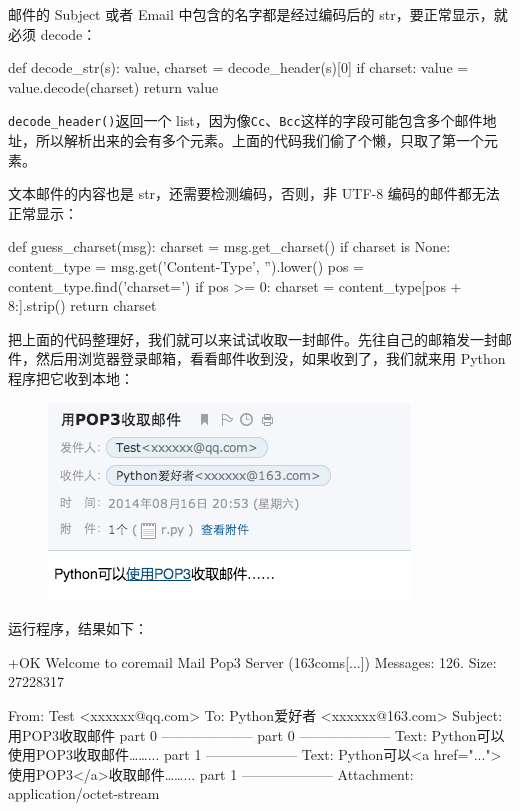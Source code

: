 邮件的 Subject 或者 Email 中包含的名字都是经过编码后的
str，要正常显示，就必须 decode：

\begin{pythoncode}
def decode_str(s):
    value, charset = decode_header(s)[0]
    if charset:
        value = value.decode(charset)
    return value
\end{pythoncode}

\texttt{decode\_header()}返回一个
list，因为像\texttt{Cc}、\texttt{Bcc}这样的字段可能包含多个邮件地址，所以解析出来的会有多个元素。上面的代码我们偷了个懒，只取了第一个元素。

文本邮件的内容也是 str，还需要检测编码，否则，非 UTF-8
编码的邮件都无法正常显示：

\begin{pythoncode}
def guess_charset(msg):
    charset = msg.get_charset()
    if charset is None:
        content_type = msg.get('Content-Type', '').lower()
        pos = content_type.find('charset=')
        if pos >= 0:
            charset = content_type[pos + 8:].strip()
    return charset
\end{pythoncode}

把上面的代码整理好，我们就可以来试试收取一封邮件。先往自己的邮箱发一封邮件，然后用浏览器登录邮箱，看看邮件收到没，如果收到了，我们就来用
Python 程序把它收到本地：

 
 \begin{figure}[htp]
	\centering
	\includegraphics[width=0.6\linewidth]{fig/967965753208928.png}
\end{figure}


运行程序，结果如下：

\begin{pythoncode}
+OK Welcome to coremail Mail Pop3 Server (163coms[...])
Messages: 126. Size: 27228317

From: Test <xxxxxx@qq.com>
To: Python爱好者 <xxxxxx@163.com>
Subject: 用POP3收取邮件
part 0
--------------------
  part 0
  --------------------
    Text: Python可以使用POP3收取邮件……...
  part 1
  --------------------
    Text: Python可以<a href="...">使用POP3</a>收取邮件……...
part 1
--------------------
  Attachment: application/octet-stream
\end{pythoncode}


